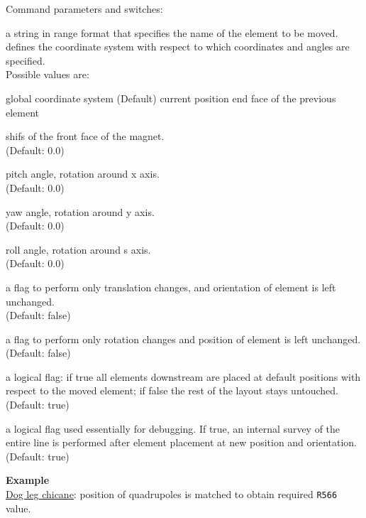 Command parameters and switches:
\begin{madlist}
    a string in range format that specifies the name of
   the element to be moved. \\

    defines the coordinate system with respect to which coordinates and
     angles are specified. \\
     Possible values are:
     \begin{madlist}
          global coordinate system  (Default)
           current position
          end face of the previous element
     \end{madlist}

    shifs of the front face of the
   magnet. \\ (Default: 0.0)

    pitch angle, rotation around x axis. \\ (Default: 0.0)

    yaw angle, rotation around y axis. \\ (Default: 0.0)

    roll angle, rotation around s axis. \\ (Default: 0.0)

    a flag to perform only translation changes, and
   orientation of element is left unchanged. \\ (Default: false)

    a flag to perform only rotation changes and
   position of element is left unchanged. \\ (Default: false)

    a logical flag: if true all elements
   downstream are placed at default positions with respect to the moved
   element; if false the rest of the layout stays untouched. \\
   (Default: true)

    a logical flag used essentially for debugging.
     If true, an internal survey of the entire line is performed after element
     placement at new position and orientation. \\
     (Default: true)
\end{madlist}

\textbf{Example }\\
\href{http://cern.ch/frs/mad-X_examples/ptc_madx_interface/eplacement/chicane.madx}{Dog
  leg chicane}: position of quadrupoles is matched to obtain required
\texttt{R566} value.


